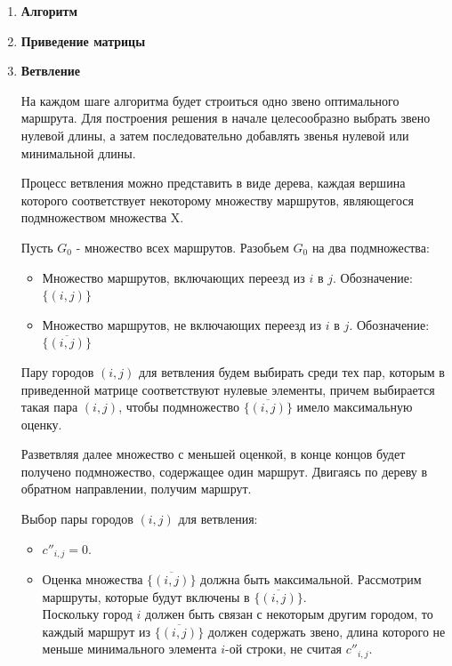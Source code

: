 \documentclass[17pt]{extarticle}
\begin{document}
\begin{enumerate}
    \item[] \textbf{Алгоритм}
    \item \textbf{Приведение матрицы}
    \item \textbf{Ветвление}

          На каждом шаге алгоритма будет строиться одно звено
          оптимального маршрута. Для построения решения в начале
          целесообразно выбрать звено нулевой длины, а затем
          последовательно добавлять звенья нулевой или минимальной длины.

          Процесс ветвления можно представить в виде
          дерева, каждая вершина которого соответствует некоторому
          множеству маршрутов, являющегося подмножеством множества X.

          Пусть \( G_0 \) - множество всех маршрутов. Разобьем \( G_0 \) на два подмножества:

          \begin{itemize}
              \item Множество маршрутов, включающих переезд из \( i \) в \( j \). Обозначение: \(\{(i, j)\}\)
              \item Множество маршрутов, не включающих переезд из \( i \) в \( j \). Обозначение: \(\{\overline{(i, j)}\}\)
          \end{itemize}

          Пару городов \((i, j)\) для ветвления будем выбирать среди тех пар, которым в приведенной матрице соответствуют нулевые элементы, причем выбирается такая пара \((i, j)\),
          чтобы подмножество \(\{\overline{(i, j)}\}\) имело максимальную оценку.

          Разветвляя далее множество с меньшей оценкой, в конце концов будет получено подмножество, содержащее один маршрут.
          Двигаясь по дереву в обратном направлении, получим маршрут.

          Выбор пары городов \((i, j)\) для ветвления:
          \begin{itemize}
              \item \( c''_{i,j} = 0 \).

              \item Оценка множества \(\{\overline{(i, j)}\}\) должна быть максимальной.
                    Рассмотрим маршруты, которые будут включены в \(\{\overline{(i, j)}\}\). \\
                    Поскольку город \(i\) должен быть связан с некоторым другим городом,
                    то каждый маршрут из \(\{\overline{(i, j)}\}\) должен содержать звено,
                    длина которого не меньше минимального элемента \(i\)-ой строки, не считая \( c''_{i,j} \).


\end{itemize}
\end{enumerate}
\end{document}
